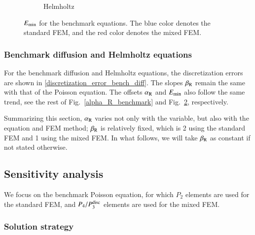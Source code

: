 \documentclass[review,3p]{elsarticle}
\begin{document}
\begin{figure}[!ht]
\begin{subfigure}[b]{0.35\textwidth}
{
}
\vspace{-0.2cm}
\caption{Helmholtz}
\label{E_min_benchmark_Helmholtz}
\end{subfigure}
\caption{$E_{\rm min}$ for the benchmark equations. The blue color denotes the standard FEM, and the red color denotes the mixed FEM.}
\label{E_min_benchmark}
\end{figure}


\subsubsection{Benchmark diffusion and Helmholtz equations}      \label{section_equation_type}

For the benchmark diffusion and Helmholtz equations, the discretization errors are shown in \ref{discretization_error_bench_diff}.
The slopes $\beta_{\rm R}$ remain the same with that of the Poisson equation.
The offsets $\alpha_{\rm R}$ and  $E_{\rm min}$ also follow the same trend, see the rest of Fig.~\ref{alpha_R_benchmark} and Fig.~\ref{E_min_benchmark}, respectively.

Summarizing this section, $\alpha_{\rm R}$ varies not only with the variable, but also with the equation and FEM method; $\beta_{\rm R}$ is relatively fixed, which is 2 using the standard FEM and 1 using the mixed FEM. In what follows, we will take $\beta_{\rm R}$ as constant if not stated otherwise.

\subsection{Sensitivity analysis}       \label{section_sensitivity}

We focus on the benchmark Poisson equation, for which $P_2$ elements are used for the standard FEM, and $P_4/P_3^{\rm disc}$ elements are used for the mixed FEM.

\subsubsection{Solution strategy}		\label{section_solver}
\end{document}
